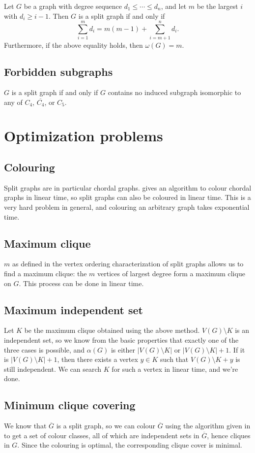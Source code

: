 \documentclass[11pt]{article}
\begin{document}
Let $G$ be a graph with degree sequence $d_1\le\cdots\le d_n$, and let $m$ be the largest $i$ with $d_i\ge i-1$.
Then $G$ is a split graph if and only if \[\sum_{i=1}^md_i=m(m-1)+\sum_{i=m+1}^nd_i.\]
Furthermore, if the above equality holds, then $\omega(G)=m$. \cite{Hammer}


\subsection{Forbidden subgraphs}

$G$ is a split graph if and only if $G$ contains no induced subgraph isomorphic to any of $C_4$, $\overline{C_4}$, or $C_5$. \cite{Hammer}


\section{Optimization problems}

\subsection{Colouring}

Split graphs are in particular chordal graphs.
\cite{Golumbic} gives an algorithm to colour chordal graphs in linear time, so split graphs can also be coloured in linear time.
This is a very hard problem in general, and colouring an arbitrary graph takes exponential time.


\subsection{Maximum clique}

$m$ as defined in the vertex ordering characterization of split graphs allows us to find a maximum clique: the $m$ vertices of largest degree form a maximum clique on $G$.
This process can be done in linear time.


\subsection{Maximum independent set}

Let $K$ be the maximum clique obtained using the above method.
$V(G)\setminus K$ is an independent set, so we know from the basic properties that exactly one of the three cases is possible, and $\alpha(G)$ is either $|V(G)\setminus K|$ or $|V(G)\setminus K|+1$.
If it is $|V(G)\setminus K|+1$, then there exists a vertex $y\in K$ such that $V(G)\setminus K + y$ is still independent.
We can search $K$ for such a vertex in linear time, and we're done.


\subsection{Minimum clique covering}

We know that $\overline{G}$ is a split graph, so we can colour $\overline{G}$ using the algorithm given in \cite{Golumbic} to get a set of colour classes, all of which are independent sets in $\overline{G}$, hence cliques in $G$.
Since the colouring is optimal, the corresponding clique cover is minimal.




\end{document}
